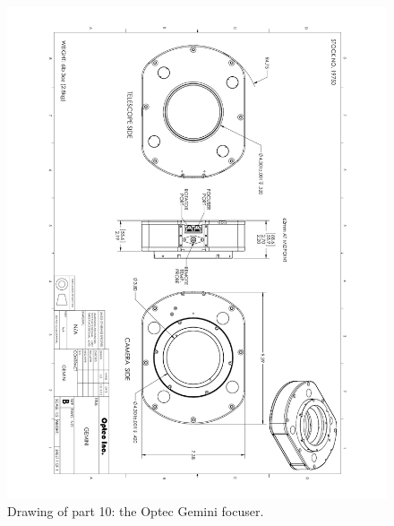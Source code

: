 \begin{figure}
\begin{center}
\includegraphics[angle=180,width=0.9\linewidth]{figures/huitzi-f20-part-10.pdf}
\end{center}
\caption{Drawing of part 10: the Optec Gemini focuser.}
\label{figure:huitzi-f20-part-10}
\end{figure}

